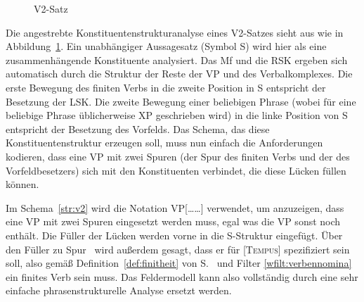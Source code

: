 \begin{figure}
  \vspace{0.3cm}
  \caption{V2-Satz}
  \label{fig:v2satz}
\end{figure}


Die angestrebte Konstituentenstrukturanalyse eines V2-Satzes sieht aus wie in Abbildung~\ref{fig:v2satz}.
Ein unabhängiger Aussagesatz (Symbol S) wird hier als eine zusammenhängende Konstituente analysiert.
Das Mf und die RSK ergeben sich automatisch durch die Struktur der Reste der VP und des Verbalkomplexes.
Die erste Bewegung des finiten Verbs in die zweite Position in S entspricht der Besetzung der LSK.
Die zweite Bewegung einer beliebigen Phrase (wobei für eine beliebige Phrase üblicherweise XP geschrieben wird) in die linke Position von S entspricht der Besetzung des Vorfelds.
Das Schema, das diese Konstituentenstruktur erzeugen soll, muss nun einfach die Anforderungen kodieren, dass eine VP mit zwei Spuren (der Spur des finiten Verbs und der des Vorfeldbesetzers) sich mit den Konstituenten verbindet, die diese Lücken füllen können.


Im Schema~\ref{str:v2} wird die Notation VP[\ldots\Ti\ldots\Tii] verwendet, um anzuzeigen, dass eine VP mit zwei Spuren eingesetzt werden muss, egal was die VP sonst noch enthält.
Die Füller der Lücken werden vorne in die S-Struktur eingefügt.
Über den Füller zu Spur \Ti\ wird außerdem gesagt, dass er für [\textsc{Tempus}] spezifiziert sein soll, also gemäß Definition~\ref{def:finitheit} von S.~\pageref{def:finitheit} und Filter \ref{wfilt:verbennomina} ein finites Verb sein muss.
Das Feldermodell kann also vollständig durch eine sehr einfache phrasenstrukturelle Analyse ersetzt werden.

